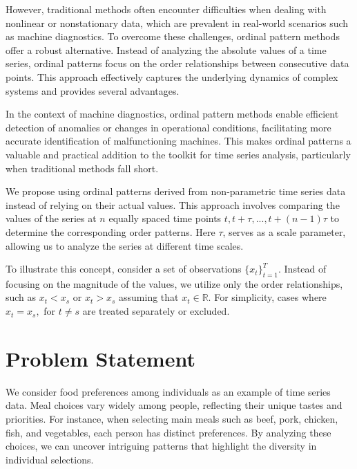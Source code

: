 However, traditional methods often encounter difficulties when dealing with nonlinear or nonstationary data, which are prevalent in real-world scenarios such as machine diagnostics. 
To overcome these challenges, ordinal pattern methods offer a robust alternative. Instead of analyzing the absolute values of a time series, ordinal patterns focus on the order relationships between consecutive data points. This approach effectively captures the underlying dynamics of complex systems and provides several advantages. 

In the context of machine diagnostics, ordinal pattern methods enable efficient detection of anomalies or changes in operational conditions, facilitating more accurate identification of malfunctioning machines. 
This makes ordinal patterns a valuable and practical addition to the toolkit for time series analysis, particularly when traditional methods fall short.

We propose using ordinal patterns derived from non-parametric time series data instead of relying on their actual values. 
This approach involves comparing the values of the series at $n$ equally spaced time points $t, t+\tau, ..., t+(n-1)\tau$ 
to determine the corresponding order patterns. Here $\tau$, serves as a scale parameter, allowing us to analyze the series at different time scales.
 
To illustrate this concept, consider a set of observations $\{x_t\}^T_{t=1}$. Instead of focusing on the magnitude of the values, we utilize only the order relationships, such as $x_t< x_s$ or $x_t >x_s$ assuming that $x_t \in \mathbb{R}$. For simplicity, cases where  $x_t =x_s,$ for $t\neq s$ are treated separately or excluded.   

\section*{Problem Statement}
We consider food preferences among individuals as an example of time series data. Meal choices vary widely among people, reflecting their unique tastes and priorities. For instance, when selecting main meals such as beef, pork, chicken, fish, and vegetables, each person has distinct preferences. By analyzing these choices, we can uncover intriguing patterns that highlight the diversity in individual selections.

